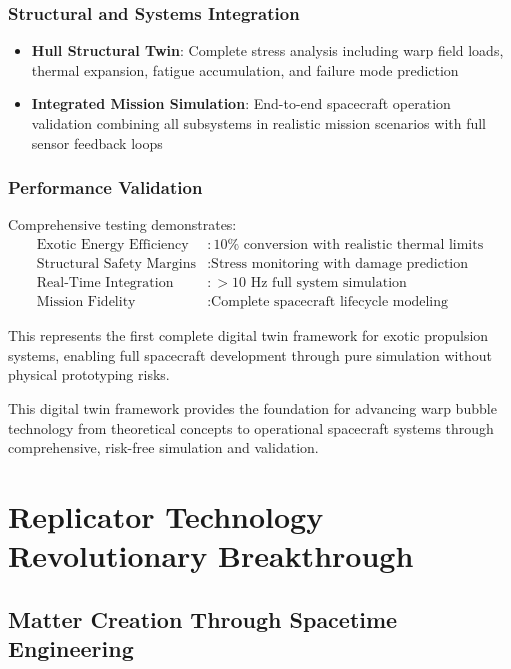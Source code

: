\documentclass[11pt]{article}
\begin{document}
\subsubsection{Structural and Systems Integration}
\begin{itemize}
\item \textbf{Hull Structural Twin}: Complete stress analysis including warp field loads, thermal expansion, fatigue accumulation, and failure mode prediction
\item \textbf{Integrated Mission Simulation}: End-to-end spacecraft operation validation combining all subsystems in realistic mission scenarios with full sensor feedback loops
\end{itemize}

\subsubsection{Performance Validation}
Comprehensive testing demonstrates:
\begin{align}
\text{Exotic Energy Efficiency} &: 10\% \text{ conversion with realistic thermal limits} \\
\text{Structural Safety Margins} &: \text{Stress monitoring with damage prediction} \\
\text{Real-Time Integration} &: >10 \text{ Hz full system simulation} \\
\text{Mission Fidelity} &: \text{Complete spacecraft lifecycle modeling}
\end{align}

This represents the first complete digital twin framework for exotic propulsion systems, enabling full spacecraft development through pure simulation without physical prototyping risks.

This digital twin framework provides the foundation for advancing warp bubble technology from theoretical concepts to operational spacecraft systems through comprehensive, risk-free simulation and validation.

\section{Replicator Technology Revolutionary Breakthrough}

\subsection{Matter Creation Through Spacetime Engineering}
\end{document}
